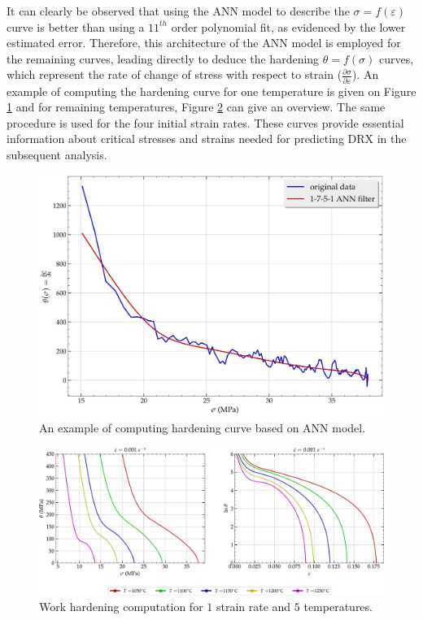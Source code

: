 \documentclass[metals,article,submit,pdftex,moreauthors]{Definitions/mdpi}
\begin{document}
It can clearly be observed that using the ANN model to describe the $\sigma=f(\varepsilon)$ curve is better than using a $11^{th}$ order polynomial fit, as evidenced by the lower estimated error.
Therefore, this architecture of the ANN model is employed for the remaining curves, leading directly to deduce the hardening $\theta=f(\sigma)$ curves, which represent the rate of change of stress with respect to strain ($\frac{\partial \sigma}{\partial \varepsilon}$).
An example of computing the hardening curve for one temperature is given on Figure \ref{fig:AnnTheta} and for remaining temperatures, Figure \ref{fig:nThetaOP} can give an overview.
The same procedure is used for the four initial strain rates.
These curves provide essential information about critical stresses and strains needed for predicting DRX in the subsequent analysis.

\begin{figure}[H]
\includegraphics[width=0.7\columnwidth]{Figures/AnnTheta}
\caption{An example of computing hardening curve based on ANN model.}
\label{fig:AnnTheta}
\end{figure}

\begin{figure}[H]
\includegraphics[width=0.99\columnwidth]{Figures/nThetaOP}
\caption{Work hardening computation for $1$ strain rate and $5$ temperatures.}
\label{fig:nThetaOP}
\end{figure}
\end{document}
